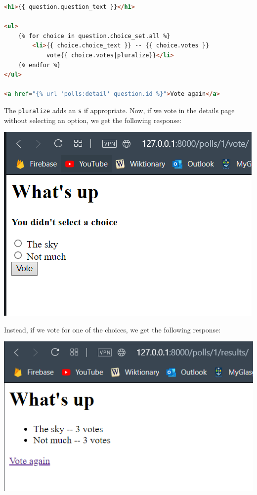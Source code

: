 \documentclass[a4paper, openany]{memoir}
\begin{document}
\begin{lstlisting}[language=html]
<h1>{{ question.question_text }}</h1>

<ul>
    {% for choice in question.choice_set.all %}
        <li>{{ choice.choice_text }} -- {{ choice.votes }} 
            vote{{ choice.votes|pluralize}}</li>
    {% endfor %}
</ul>

<a href="{% url 'polls:detail' question.id %}">Vote again</a>
\end{lstlisting}
    The \texttt{pluralize} adds an \texttt{s} if appropriate. Now, if we vote in the details page without selecting an option, we get the following response:
    \begin{center}
        \includegraphics[scale=0.7]{src/Django10.PNG}
    \end{center}
    Instead, if we vote for one of the choices, we get the following response:
    \begin{center}
        \includegraphics[scale=0.7]{src/Django11.PNG}
    \end{center}
    \newpage
\end{document}

